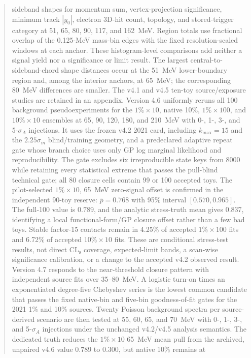\documentclass[11pt]{article}
\newcommand{\CLs}{CL$_\mathrm{s}$}
\begin{document}
\begin{abstract}
sideband shapes for momentum sum, vertex-projection significance, minimum
track $|y_0|$, electron 3D-hit count, topology, and stored-trigger category at
51, 65, 80, 90, 117, and 162~MeV.  Region totals use fractional overlap of
the 0.125-MeV mass-bin edges with the fixed resolution-scaled windows at each
anchor.  These histogram-level comparisons add neither a signal yield nor a
significance or limit result.  The largest central-to-sideband-chord shape
distances occur at the 51~MeV lower-boundary region and, among the interior
anchors, at 65~MeV; the corresponding 80~MeV differences are smaller.
The v4.1 and v4.5 ten-toy source/exposure studies are retained in an appendix.
Version 4.6 uniformly reruns all 100 background pseudoexperiments for the
$1\%\times10$, native 10\%, $1\%\times100$, and $10\%\times10$ ensembles at
65, 90, 120, 180, and 210~MeV with 0-, 1-, 3-, and 5-$\sigma_A$ injections.
It uses the frozen v4.2 2021 card, including $k_{\max}=15$ and the
$2.25\sigma_m$ blind/training geometry, and a predeclared adaptive repeat gate
whose branch choice uses only GP log marginal likelihood and reproducibility.
The gate excludes six irreproducible state keys from 8000 while retaining every
statistical extreme that passes the pull-blind technical gate; all 80 closure cells contain
99 or 100 accepted toys.  The pilot-selected $1\%\times10$, 65~MeV
zero-signal offset is confirmed in the independent 90-toy reserve:
$\bar p=0.768$ with 95\% interval $[0.570,0.965]$.  The full-100 value is
$0.789$, and the analytic stress-truth mean gives 0.837, identifying a local
functional-form/GP closure offset rather than a few bad toys.  Stable
factor-15 contacts remain in 4.25\% of accepted $1\%\times100$ fits and 6.72\%
of accepted $10\%\times10$ fits.  These are conditional stress-test results,
not direct \CLs{} coverage, expected-limit bands, a scan-wise significance
calibration, or a change to the accepted v4.2 observed result.
Version 4.7 responds to the near-threshold closure pattern with independent
source fits over 35--80~MeV.  A logistic turn-on times an exponentiated
degree-five Chebyshev series is the lowest common candidate that passes the
fixed native-bin and five-bin goodness-of-fit gates for the 2021 1\% and 10\%
sources.  Twenty Poisson background spectra per source-derived scenario are
then tested at 55, 60, 65, and 70~MeV with 0-, 1-, 3-, and
5-$\sigma_A$ injections under the unchanged v4.2/v4.5 analysis semantics.
The dedicated truth reduces the $1\%\times10$ 65~MeV mean pull from the
archived, unpaired v4.6 value 0.789 to 0.300, but native 10\% remains at

\end{abstract}
\end{document}
